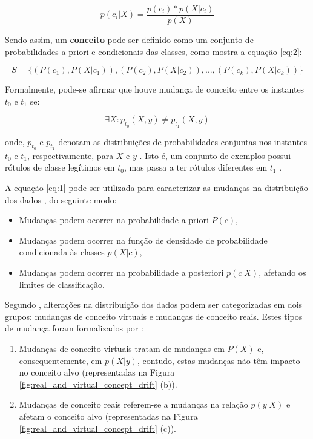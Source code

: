 \documentclass[qual, classic, a4paper]{ufbathesis}
\begin{document}
\begin{equation} \label{eq:1}
p(c_i|X) = \frac{p(c_i) * p(X|c_i)}{p(X)}
\end{equation}

Sendo assim, um \textbf{conceito} pode ser definido como um conjunto de probabilidades a priori e condicionais das classes, como mostra a equação \ref{eq:2}:

\begin{equation} \label{eq:2}
    S = \{(P(c_1), P(X|c_1)), (P(c_2), P(X|c_2)), ..., (P(c_k), P(X|c_k))\}
\end{equation}

Formalmente, pode-se afirmar que houve mudança de conceito entre os instantes $t_0$ e $t_1$ se:

\begin{equation} \label{eq:3}
    {\exists}X : p_{t_0}(X, y) \ne p_{t_1}(X, y)
\end{equation}

onde, $p_{t_0}$ e $p_{t_1}$ denotam as distribuições de probabilidades conjuntas nos instantes $t_0$ e $t_1$, respectivamente, 
para $X$ e $y$ \cite{Gama:2014:SCD:2597757.2523813}. 
Isto é, um conjunto de exemplos possui rótulos de classe legítimos em $t_0$, mas passa a ter rótulos diferentes em $t_1$ \cite{Kolter:2007:DWM:1314498.1390333}.

A equação \ref{eq:1} pode ser utilizada para caracterizar as mudanças na distribuição dos dados \cite{Gao:2007, Gama:2014:SCD:2597757.2523813}, do seguinte modo:

\begin{itemize}
    \item Mudanças podem ocorrer na probabilidade a priori $P(c)$,
    \item Mudanças podem ocorrer na função de densidade de probabilidade condicionada às classes $p(X|c)$,
    \item Mudanças podem ocorrer na probabilidade a posteriori $p(c|X)$, afetando os limites de classificação.
\end{itemize}

Segundo \cite{Widmer:1996:LPC:226791.226798}, alterações na distribuição dos dados podem ser categorizadas em dois grupos:
mudanças de conceito virtuais e mudanças de conceito reais.
Estes tipos de mudança foram formalizados por \cite{Zliobaite:2010, Gama:2014:SCD:2597757.2523813}:

\begin{enumerate}
    \item Mudanças de conceito virtuais tratam de mudanças em $P(X)$ e, consequentemente, em $p(X|y)$,
    contudo, estas mudanças não têm impacto no conceito alvo (representadas na Figura \ref{fig:real_and_virtual_concept_drift} (b)).
    \item Mudanças de conceito reais referem-se a mudanças na relação $p(y|X)$ e afetam o conceito alvo (representadas na Figura \ref{fig:real_and_virtual_concept_drift} (c)).
\end{enumerate}
\end{document}

